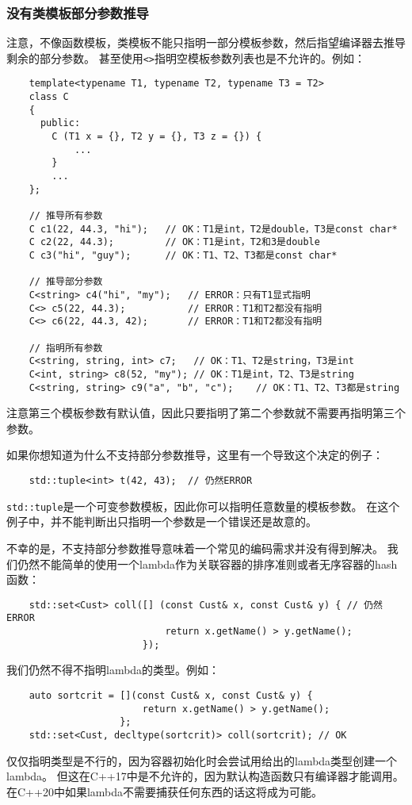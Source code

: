\subsubsection{没有类模板部分参数推导}
注意，不像函数模板，类模板不能只指明一部分模板参数，然后指望编译器去推导剩余的部分参数。
甚至使用\texttt{<>}指明空模板参数列表也是不允许的。例如：
\begin{lstlisting}
    template<typename T1, typename T2, typename T3 = T2>
    class C
    {
      public:
        C (T1 x = {}, T2 y = {}, T3 z = {}) {
            ...
        }
        ...
    };

    // 推导所有参数
    C c1(22, 44.3, "hi");   // OK：T1是int，T2是double，T3是const char*
    C c2(22, 44.3);         // OK：T1是int，T2和3是double
    C c3("hi", "guy");      // OK：T1、T2、T3都是const char*

    // 推导部分参数
    C<string> c4("hi", "my");   // ERROR：只有T1显式指明
    C<> c5(22, 44.3);           // ERROR：T1和T2都没有指明
    C<> c6(22, 44.3, 42);       // ERROR：T1和T2都没有指明

    // 指明所有参数
    C<string, string, int> c7;   // OK：T1、T2是string，T3是int
    C<int, string> c8(52, "my"); // OK：T1是int，T2、T3是string
    C<string, string> c9("a", "b", "c");    // OK：T1、T2、T3都是string
\end{lstlisting}
注意第三个模板参数有默认值，因此只要指明了第二个参数就不需要再指明第三个参数。

如果你想知道为什么不支持部分参数推导，这里有一个导致这个决定的例子：
\begin{lstlisting}
    std::tuple<int> t(42, 43);  // 仍然ERROR
\end{lstlisting}
\texttt{std::tuple}是一个可变参数模板，因此你可以指明任意数量的模板参数。
在这个例子中，并不能判断出只指明一个参数是一个错误还是故意的。

不幸的是，不支持部分参数推导意味着一个常见的编码需求并没有得到解决。
我们仍然不能简单的使用一个lambda作为关联容器的排序准则或者无序容器的hash函数：
\begin{lstlisting}
    std::set<Cust> coll([] (const Cust& x, const Cust& y) { // 仍然ERROR
                            return x.getName() > y.getName();
                        });
\end{lstlisting}
我们仍然不得不指明lambda的类型。例如：
\begin{lstlisting}
    auto sortcrit = [](const Cust& x, const Cust& y) {
                        return x.getName() > y.getName();
                    };
    std::set<Cust, decltype(sortcrit)> coll(sortcrit); // OK
\end{lstlisting}
仅仅指明类型是不行的，因为容器初始化时会尝试用给出的lambda类型创建一个lambda。
但这在C++17中是不允许的，因为默认构造函数只有编译器才能调用。
在C++20中如果lambda不需要捕获任何东西的话这将成为可能。

